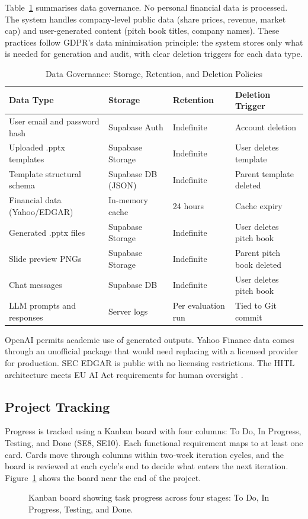 Table~\ref{tab:data-governance} summarises data governance. No personal financial data is processed. The system handles company-level public data (share prices, revenue, market cap) and user-generated content (pitch book titles, company names). These practices follow GDPR's data minimisation principle: the system stores only what is needed for generation and audit, with clear deletion triggers for each data type.

\begin{table}[H]
\centering
\begin{tabular}{|l|l|l|l|}
\hline
\rowcolor{gray!20} \textbf{Data Type} & \textbf{Storage} & \textbf{Retention} & \textbf{Deletion Trigger} \\
\hline
User email and password hash & Supabase Auth & Indefinite & Account deletion \\
\hline
Uploaded .pptx templates & Supabase Storage & Indefinite & User deletes template \\
\hline
Template structural schema & Supabase DB (JSON) & Indefinite & Parent template deleted \\
\hline
Financial data (Yahoo/EDGAR) & In-memory cache & 24 hours & Cache expiry \\
\hline
Generated .pptx files & Supabase Storage & Indefinite & User deletes pitch book \\
\hline
Slide preview PNGs & Supabase Storage & Indefinite & Parent pitch book deleted \\
\hline
Chat messages & Supabase DB & Indefinite & User deletes pitch book \\
\hline
LLM prompts and responses & Server logs & Per evaluation run & Tied to Git commit \\
\hline
\end{tabular}
\caption{Data Governance: Storage, Retention, and Deletion Policies}
\label{tab:data-governance}
\end{table}

OpenAI permits academic use of generated outputs. Yahoo Finance data comes through an unofficial package that would need replacing with a licensed provider for production. SEC EDGAR is public with no licensing restrictions. The HITL architecture meets EU AI Act requirements for human oversight \parencite{bis2024}.

\subsection{Project Tracking}

Progress is tracked using a Kanban board with four columns: To Do, In Progress, Testing, and Done (SE8, SE10). Each functional requirement maps to at least one card. Cards move through columns within two-week iteration cycles, and the board is reviewed at each cycle's end to decide what enters the next iteration. Figure~\ref{fig:kanban} shows the board near the end of the project.

\begin{figure}[H]
\centering
{}
\caption{Kanban board showing task progress across four stages: To Do, In Progress, Testing, and Done.}
\label{fig:kanban}
\end{figure}


